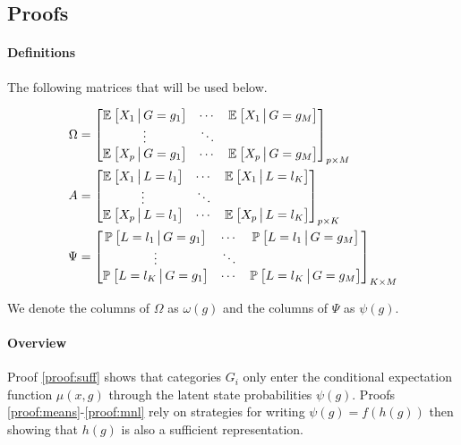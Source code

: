 \documentclass{article}
\theoremstyle{plain}
\theoremstyle{definition}
\theoremstyle{remark}
\begin{document}
\subsection{Proofs}

\paragraph{Definitions} The following matrices that will be used below.

\begin{align}
    \Omega &=
    \begin{bmatrix}
        \mathbb{E}_{}\left[X_{1} \,\big|\, G=g_{1}\right] & \cdots & \mathbb{E}_{}\left[X_{1} \,\big|\, G=g_{M}\right] \\
                \vdots     &  \ddots &  \\
        \mathbb{E}_{}\left[X_{p} \,\big|\, G=g_{1}\right] & \cdots & \mathbb{E}_{}\left[X_{p} \,\big|\, G=g_{M}\right] \\
    \end{bmatrix}_{p\times M}
    \label{eq:matrix_omega}
\\
    A &=
    \begin{bmatrix}
        \mathbb{E}_{}\left[X_{1} \,\big|\, L=l_{1}\right] & \cdots & \mathbb{E}_{}\left[X_{1} \,\big|\, L=l_{K}\right] \\
                \vdots     &  \ddots &  \\
        \mathbb{E}_{}\left[X_{p} \,\big|\, L=l_{1}\right] & \cdots & \mathbb{E}_{}\left[X_{p} \,\big|\, L=l_{K}\right] \\
    \end{bmatrix}_{p\times K}
    \label{eq:matrix_a}
\\
    \Psi &=
    \begin{bmatrix}
        \mathbb{P}_{}\left[L = l_{1} \,\big|\, G=g_{1}\right] & \cdots & \mathbb{P}_{}\left[L = l_{1} \,\big|\, G=g_{M}\right] \\
                \vdots     &  \ddots &  \\
        \mathbb{P}_{}\left[L = l_{K} \,\big|\, G=g_{1}\right] & \cdots & \mathbb{P}_{}\left[ L = l_{K} \,\big|\, G=g_{M}\right] \\
    \end{bmatrix}_{K\times M}
    \label{eq:matrix_psi}
\end{align}

We denote the columns of $\Omega$ as $\omega(g)$ and the columns of $\Psi$ as $\psi(g)$.

\paragraph{Overview} Proof \ref{proof:suff} shows that categories $G_{i}$ only enter the conditional expectation function $\mu(x, g)$ through the latent state probabilities $\psi(g)$. Proofs \ref{proof:means}-\ref{proof:mnl} rely on strategies for writing $\psi(g) = f(h(g))$ then showing that $h(g)$ is also a sufficient representation.
\end{document}
